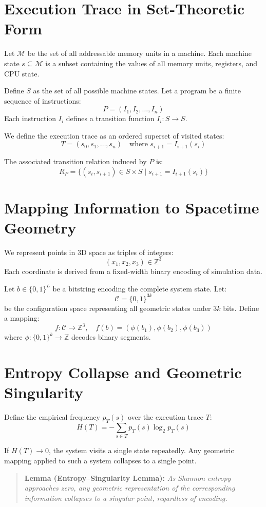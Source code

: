 \documentclass[11pt]{article}
\begin{document}
\section{Execution Trace in Set-Theoretic Form}

Let $\mathcal{M}$ be the set of all addressable memory units in a machine. Each machine state $s \subseteq \mathcal{M}$ is a subset containing the values of all memory units, registers, and CPU state.

Define $S$ as the set of all possible machine states. Let a program be a finite sequence of instructions:
\[
  P = (I_1, I_2, \dots, I_n)
\]
Each instruction $I_i$ defines a transition function $I_i : S \to S$.

We define the execution trace as an ordered superset of visited states:
\[
  T = (s_0, s_1, \dots, s_n) \quad \text{where } s_{i+1} = I_{i+1}(s_i)
\]

The associated transition relation induced by $P$ is:
\[
  R_P = \{ (s_i, s_{i+1}) \in S \times S \mid s_{i+1} = I_{i+1}(s_i) \}
\]

\section{Mapping Information to Spacetime Geometry}

We represent points in 3D space as triples of integers:
\[
  (x_1, x_2, x_3) \in \mathbb{Z}^3
\]
Each coordinate is derived from a fixed-width binary encoding of simulation data.

Let $b \in \{0,1\}^L$ be a bitstring encoding the complete system state. Let:
\[
  \mathcal{C} = \{0,1\}^{3k}
\]
be the configuration space representing all geometric states under $3k$ bits. Define a mapping:
\[
  f : \mathcal{C} \to \mathbb{Z}^3, \quad f(b) = (\phi(b_1), \phi(b_2), \phi(b_3))
\]
where $\phi : \{0,1\}^k \to \mathbb{Z}$ decodes binary segments.

\section{Entropy Collapse and Geometric Singularity}

Define the empirical frequency $p_T(s)$ over the execution trace $T$:
\[
  H(T) = -\sum_{s \in T} p_T(s) \log_2 p_T(s)
\]

If $H(T) \to 0$, the system visits a single state repeatedly. Any geometric mapping applied to such a system collapses to a single point.

\begin{quote}
  \textbf{Lemma (Entropy--Singularity Lemma):}
  \emph{As Shannon entropy approaches zero, any geometric representation of the corresponding information collapses to a singular point, regardless of encoding.}
\end{quote}
\end{document}
